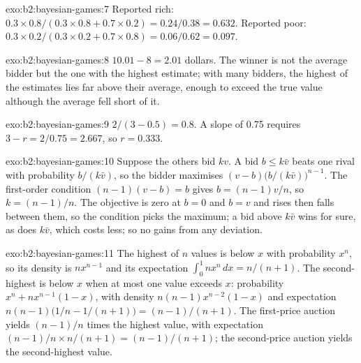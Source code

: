 \begin{solution}{exo:b2:bayesian-games:7}
Reported rich: $0.3 \times 0.8/(0.3 \times 0.8 + 0.7 \times 0.2) = 0.24/0.38 = 0.632$. Reported poor: $0.3 \times 0.2/(0.3 \times 0.2 + 0.7 \times 0.8) = 0.06/0.62 =
0.097$.
\end{solution}

\begin{solution}{exo:b2:bayesian-games:8}
$10.01 - 8 = 2.01$ dollars. The winner is not the average bidder but the one with the highest estimate; with many bidders, the
highest of the estimates lies far above their average, enough to exceed the true value although the average fell short of
it.
\end{solution}

\begin{solution}{exo:b2:bayesian-games:9}
$2/(3 - 0.5) = 0.8$. A slope of 0.75 requires $3 - r = 2/0.75 = 2.667$, so $r = 0.333$.
\end{solution}

\begin{solution}{exo:b2:bayesian-games:10}
Suppose the others bid $kv$. A bid $b \le k\bar v$ beats one rival with probability $b/(k\bar v)$, so the bidder maximises $(v - b)\big(b/(k\bar
v)\big)^{n-1}$. The first-order condition $(n - 1)(v - b) = b$ gives $b = (n - 1)v/n$, so $k = (n - 1)/n$. The objective is zero at $b = 0$ and $b = v$ and
rises then falls between them, so the condition picks the maximum; a bid above $k\bar v$ wins for sure, as does $k\bar v$, which costs
less; so no  gains from any deviation.
\end{solution}

\begin{solution}{exo:b2:bayesian-games:11}
The highest of $n$ values is below $x$ with probability $x^n$, so its density is $nx^{n-1}$ and its expectation $\int_0^1 nx^n\,dx = n/(n +
1)$. The second-highest is below $x$ when at most one value exceeds $x$: probability $x^n + nx^{n-1}(1 - x)$, with density $n(n - 1)x^{n-2}(1 -
x)$ and expectation $n(n - 1)\big(1/n - 1/(n + 1)\big) = (n - 1)/(n + 1)$. The first-price auction yields $(n - 1)/n$ times the highest value, with
expectation $(n - 1)/n \times n/(n + 1) = (n - 1)/(n + 1)$; the second-price auction yields the second-highest value.
\end{solution}

